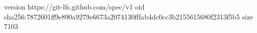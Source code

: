 version https://git-lfs.github.com/spec/v1
oid sha256:7872601ff9e890a9279e6673a2074130fffab4dc0cc3b2155615680f2313f5b5
size 7103
